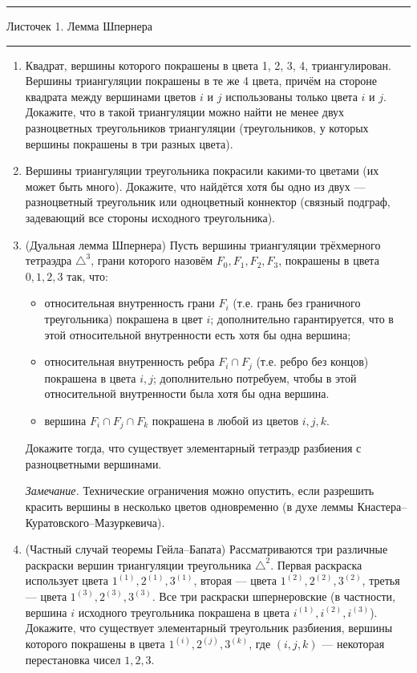 \documentclass[12pt]{article}
\newcommand{\HRule}{\rule{\linewidth}{0.5mm}}
\begin{document}
{
\HRule
 \normalfont \Large \center
   Листочек 1. Лемма Шпернера

\HRule
}



\begin{enumerate}
\setcounter{enumi}{0}
\item Квадрат, вершины которого покрашены в цвета 1, 2, 3, 4, триангулирован. Вершины триангуляции покрашены в те же 4 цвета, причём на стороне квадрата между вершинами цветов $i$ и $j$ использованы только цвета $i$ и $j$. Докажите, что в такой триангуляции можно найти не менее двух разноцветных треугольников триангуляции (треугольников, у которых вершины покрашены в три разных цвета).

  \item Вершины триангуляции треугольника покрасили какими-то цветами (их может быть много). Докажите, что найдётся хотя бы одно из двух --- разноцветный треугольник или одноцветный коннектор (связный подграф, задевающий все стороны исходного треугольника).

  \item (Дуальная лемма Шпернера) Пусть вершины триангуляции трёхмерного тетраэдра $\triangle^{3}$, грани которого назовём $F_0, F_1, F_2, F_3$, покрашены в цвета $0, 1, 2, 3$ так, что:
   \begin{itemize}
   \item относительная внутренность грани $F_i$ (т.е. грань без граничного треугольника) покрашена в цвет $i$; дополнительно гарантируется, что в этой относительной внутренности есть хотя бы одна вершина;

   \item относительная внутренность ребра $F_i \cap F_j$ (т.е. ребро без концов) покрашена в цвета $i,j$; дополнительно потребуем, чтобы в этой относительной внутренности была хотя бы одна вершина.

   \item вершина $F_i \cap F_j \cap F_k$ покрашена в любой из цветов $i,j,k$.
   \end{itemize}

   Докажите тогда, что существует элементарный тетраэдр разбиения с разноцветными вершинами.

   \emph{Замечание.} Технические ограничения можно опустить, если разрешить красить вершины в несколько цветов одновременно (в духе леммы Кнастера--Куратовского--Мазуркевича).

  \item (Частный случай теоремы Гейла--Бапата) Рассматриваются три различные раскраски вершин триангуляции треугольника $\triangle^{2}$. Первая раскраска использует цвета $1^{(1)}, 2^{(1)}, 3^{(1)}$, вторая --- цвета $1^{(2)}, 2^{(2)}, 3^{(2)}$, третья --- цвета $1^{(3)}, 2^{(3)}, 3^{(3)}$. Все три раскраски шпернеровские (в частности, вершина $i$ исходного треугольника покрашена в цвета $i^{(1)}, i^{(2)}, i^{(3)}$). Докажите, что существует элементарный треугольник разбиения, вершины которого покрашены в цвета $1^{(i)}, 2^{(j)}, 3^{(k)}$, где $(i, j, k)$ --- некоторая перестановка чисел $1,2,3$.


\end{enumerate}
\end{document}
